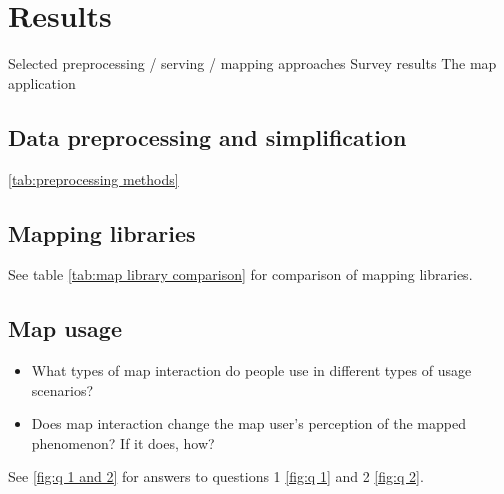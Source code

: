 \section{Results}
Selected preprocessing / serving / mapping approaches
Survey results
The map application

\subsection{Data preprocessing and simplification}

\ref{tab:preprocessing methods}



\subsection{Mapping libraries}


See table \ref{tab:map library comparison} for comparison of mapping libraries.


\subsection{Map usage}

\begin{itemize}
	\item What types of map interaction do people use
	in different types of usage scenarios?
	\item Does map interaction change
	the map user's perception of the mapped phenomenon? If it does, how?
\end{itemize}

See \ref{fig:q 1 and 2} for answers to questions 1 \ref{fig:q 1} and 2 \ref{fig:q 2}.

